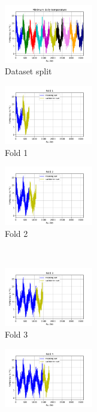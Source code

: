\documentclass[a4paper]{article}
\begin{document}
\begin{figure}
    \centering
    \begin{subfigure}{0.32\textwidth}
        \centering
        \includegraphics[width=3.85cm]{figure_1_data_split}
        \caption{Dataset split}
        \label{fig:sub1}
    \end{subfigure}
    \hfill
    \begin{subfigure}{0.32\textwidth}
        \centering
        \includegraphics[width=3.85cm]{figure_2_fold_1}
        \caption{Fold 1}
        \label{fig:sub2}
    \end{subfigure}
    \hfill
    \begin{subfigure}{0.32\textwidth}
        \centering
        \includegraphics[width=3.85cm]{figure_3_fold_2}
        \caption{Fold 2}
        \label{fig:sub3}
    \end{subfigure}%
    \\
    \begin{subfigure}{0.32\textwidth}
        \centering
        \includegraphics[width=3.85cm]{figure_4_fold_3}
        \caption{Fold 3}
        \label{fig:sub4}
    \end{subfigure}\hfill
    \begin{subfigure}{0.32\textwidth}
        \centering
        \includegraphics[width=3.85cm]{figure_5_fold_4}

\end{subfigure}
\end{figure}
\end{document}
